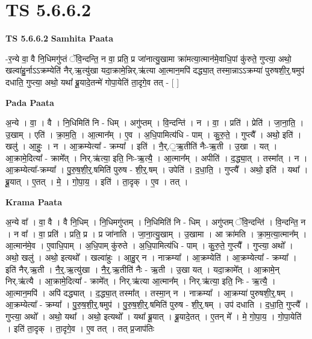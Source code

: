\documentclass[17pt]{extarticle}
\begin{document}
\section{ TS 5.6.6.2 }

\textbf{TS 5.6.6.2 } \newline
\textbf{Samhita Paata} \newline

-र॒न्ये वा॒ वै नि॒धिमगु॑प्तं ॅवि॒न्दन्ति॒ न वा॒ प्रति॒ प्र जा॑नात्यु॒खामा क्रा॑मत्या॒त्मान॑मे॒वाधि॒पां कु॑रुते॒ गुप्त्या॒ अथो॒ खल्वा॑हु॒र्नाऽऽक्रम्येति॑ नैर्.ऋ॒त्यु॑खा यदा॒क्रामे॒न्निर्.ऋ॑त्या आ॒त्मान॒मपि॑ दद्ध्या॒त् तस्मा॒न्नाऽऽक्रम्या॑ पुरुषशी॒र्॒.षमुप॑ दधाति॒ गुप्त्या॒ अथो॒ यथा᳚ ब्रू॒यादे॒तन्मे॑ गोपा॒येति॑ ता॒दृगे॒व तत् - [  ] \newline

\textbf{Pada Paata} \newline

अ॒न्ये । वा॒ । वै । नि॒धिमिति॑ नि - धिम् । अगु॑प्तम् । वि॒न्दन्ति॑ । न । वा॒ । प्रति॑ । प्रेति॑ । जा॒ना॒ति॒ । उ॒खाम् । एति॑ । क्रा॒म॒ति॒ । आ॒त्मान᳚म् । ए॒व । अ॒धि॒पामित्य॑धि - पाम् । कु॒रु॒ते॒ । गुप्त्यै᳚ । अथो॒ इति॑ । खलु॑ । आ॒हुः॒ । न । आ॒क्रम्येत्या᳚ - क्रम्या᳚ । इति॑ । नै॒र्.॒ऋ॒तीति॑ नैः-ऋ॒ती । उ॒खा । यत् । आ॒क्रामे॒दित्या᳚ - क्रामे᳚त् । निर्.ऋ॑त्या॒ इति॒ निः-ऋ॒त्यै॒ । आ॒त्मान᳚म् । अपीति॑ । द॒द्ध्या॒त् । तस्मा᳚त् । न । आ॒क्रम्येत्या᳚-क्रम्या᳚ । पु॒रु॒ष॒शी॒र्॒.षमिति॑ पुरुष - शी॒र्॒.षम् । उपेति॑ । द॒धा॒ति॒ । गुप्त्यै᳚ । अथो॒ इति॑ । यथा᳚ । ब्रू॒यात् । ए॒तत् । मे॒ । गो॒पा॒य॒ । इति॑ । ता॒दृक् । ए॒व । तत् ।  \newline


\textbf{Krama Paata} \newline

अ॒न्ये वा᳚ । वा॒ वै । वै नि॒धिम् । नि॒धिमगु॑प्तम् । नि॒धिमिति॑ नि - धिम् । अगु॑प्तम् ॅवि॒न्दन्ति॑ । वि॒न्दन्ति॒ न । न वा᳚ । वा॒ प्रति॑ । प्रति॒ प्र । प्र जा॑नाति । जा॒ना॒त्यु॒खाम् । उ॒खामा । आ क्रा॑मति । क्रा॒म॒त्या॒त्मान᳚म् । आ॒त्मान॑मे॒व । ए॒वाधि॒पाम् । अ॒धि॒पाम् कु॑रुते । अ॒धि॒पामित्य॑धि - पाम् । कु॒रु॒ते॒ गुप्त्यै᳚ । गुप्त्या॒ अथो᳚ । अथो॒ खलु॑ । अथो॒ इत्यथो᳚ । खल्वा॑हुः । आ॒हु॒र् न । नाक्रम्या᳚ । आ॒क्रम्येति॑ । आ॒क्रम्येत्या᳚ - क्रम्या᳚ । इति॑ नैर्.ऋ॒ती । नै॒र्॒.ऋ॒त्यु॑खा । नै॒र्॒.ऋ॒तीति॑ नैः - ऋ॒ती । उ॒खा यत् । यदा॒क्रामे᳚त् । आ॒क्रामे॒न् निर्.ऋ॑त्यै । आ॒क्रामे॒दित्या᳚ - क्रामे᳚त् । निर्.ऋ॑त्या आ॒त्मान᳚म् । निर्.ऋ॑त्या॒ इति॒ निः - ऋ॒त्यै॒ । आ॒त्मान॒मपि॑ । अपि॑ दद्ध्यात् । द॒द्ध्या॒त् तस्मा᳚त् । तस्मा॒न् न । नाक्रम्या᳚ । आ॒क्रम्या॑ पुरुषशी॒र्॒.षम् । आ॒क्रम्येत्या᳚ - क्रम्या᳚ । पु॒रु॒ष॒शी॒र्॒.षमुप॑ । पु॒रु॒ष॒शी॒र्॒.षमिति॑ पुरुष - शी॒र्॒.षम् । उप॑ दधाति । द॒धा॒ति॒ गुप्त्यै᳚ । गुप्त्या॒ अथो᳚ । अथो॒ यथा᳚ । अथो॒ इत्यथो᳚ । यथा᳚ ब्रू॒यात् । ब्रू॒यादे॒तत् । ए॒तन् मे᳚ । मे॒ गो॒पा॒य॒ । गो॒पा॒येति॑ । इति॑ ता॒दृक् । ता॒दृगे॒व । ए॒व तत् । तत् प्र॒जाप॑तिः \newline
\end{document}
